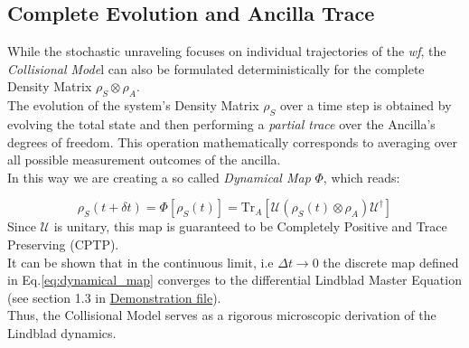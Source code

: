 \documentclass[a4paper,12pt]{article}
\begin{document}
	\subsection{Complete Evolution and Ancilla Trace}
	\label{sub:complete_evolution}
	While the stochastic unraveling focuses on individual trajectories of the \textit{wf}, the \textit{Collisional Mode}l can also be formulated deterministically for the complete Density Matrix $ \rho_S \otimes \rho_A $. \\
	The evolution of the system's Density Matrix $\rho_S$ over a time step is obtained by evolving the total state and then performing a \textit{partial trace} over the Ancilla's degrees of freedom. This operation mathematically corresponds to averaging over all possible measurement outcomes of the ancilla. \\
	In this way we are creating a so called \textit{Dynamical Map} $ \Phi $, which reads:

	\begin{equation}
		\rho_S(t + \delta t) = \Phi[\rho_S(t)] = \text{Tr}_A \left[ \mathcal{U} \left( \rho_S(t) \otimes \rho_A \right) \mathcal{U} ^\dagger \right]
		\label{eq:dynamical_map}
	\end{equation}
	Since $\mathcal{U}$ is unitary, this map is guaranteed to be Completely Positive and Trace Preserving (CPTP).\\
	It can be shown that in the continuous limit, i.e $ \Delta t \rightarrow 0 $ the discrete map defined in Eq.\ref{eq:dynamical_map} converges to the differential Lindblad Master Equation (see section 1.3 in \href{run:./Demonstration.pdf}{Demonstration file}). \\
	Thus, the Collisional Model serves as a rigorous microscopic derivation of the Lindblad dynamics.
\end{document}
